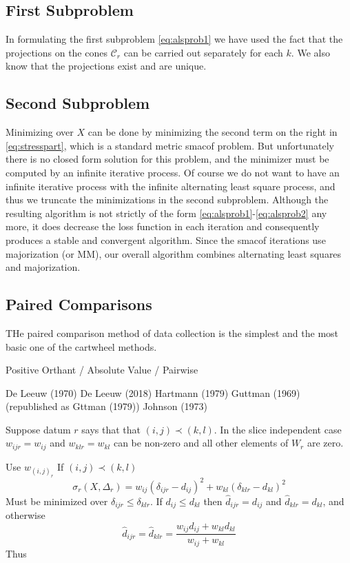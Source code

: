 \documentclass[
  12pt,
]{article}
\begin{document}
\subsection{First Subproblem}\label{first-subproblem}

In formulating the first subproblem \eqref{eq:alsprob1} we have used the fact that the projections on the cones \(\mathcal{C}_r\) can be carried out separately for each \(k\). We also know that the projections exist and are unique.

\subsection{Second Subproblem}\label{second-subproblem}

Minimizing over \(X\) can be done by minimizing the second term on the right in
\eqref{eq:stresspart}, which is a standard metric smacof problem. But unfortunately there is no closed form solution for this problem, and the
minimizer must be computed by an infinite iterative process. Of course
we do not want to have an infinite iterative process with the infinite alternating least square process, and thus we truncate the minimizations
in the second subproblem. Although the resulting algorithm is not
strictly of the form \eqref{eq:alsprob1}-\eqref{eq:alsprob2} any more, it does
decrease the loss function in each iteration and consequently
produces a stable and convergent algorithm. Since the smacof iterations
use majorization (or MM), our overall algorithm combines alternating
least squares and majorization.

\subsection{Paired Comparisons}\label{paired-comparisons}

THe paired comparison method of data collection is the simplest and
the most basic one of the cartwheel methods.

Positive Orthant / Absolute Value / Pairwise

De Leeuw (1970)
De Leeuw (2018)
Hartmann (1979)
Guttman (1969) (republished as Gttman (1979))
Johnson (1973)

Suppose datum \(r\) says that that \((i,j)\prec(k,l)\). In the slice independent case \(w_{ijr}=w_{ij}\) and \(w_{klr}=w_{kl}\)
can be non-zero and all other elements of \(W_r\) are zero.

Use \(w_{(i,j)_r}\)
If \((i,j)\prec(k,l)\)
\[
\sigma_r(X,\Delta_r)=w_{ij}(\delta_{ijr}-d_{ij})^2+w_{kl}(\delta_{klr}-d_{kl})^2
\]
Must be minimized over \(\delta_{ijr}\leq\delta_{klr}\). If \(d_{ij}\leq d_{kl}\)
then \(\hat d_{ijr}=d_{ij}\) and \(\hat d_{klr}=d_{kl}\), and otherwise
\[
\hat d_{ijr}=\hat d_{klr}=\frac{w_{ij}d_{ij}+w_{kl}d_{kl}}{w_{ij}+w_{kl}}
\]
Thus
\end{document}
